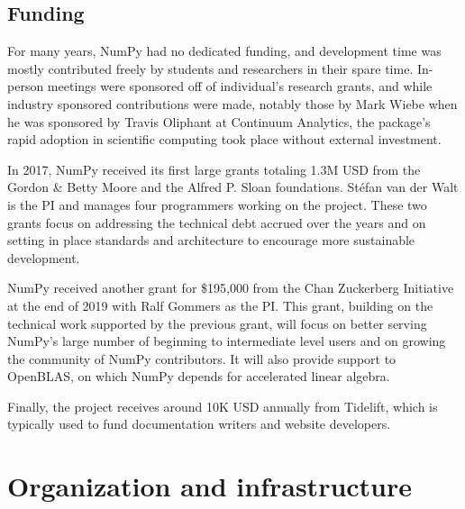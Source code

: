 \subsection{Funding}

For many years, NumPy had no dedicated funding, and development time
was mostly contributed freely by students and researchers in their
spare time.  In-person meetings were sponsored off of individual's
research grants, and while industry sponsored contributions were made,
notably those by Mark Wiebe when he was sponsored by Travis Oliphant
at Continuum Analytics, the package's rapid adoption in scientific
computing took place without external investment.

In 2017, NumPy received its first large grants totaling 1.3M USD from the
Gordon \& Betty Moore and the Alfred P. Sloan foundations.
Stéfan van der Walt is the PI and manages four programmers working on the project.
These two grants focus on addressing the technical debt accrued over the years and
on setting in place standards and architecture to encourage more sustainable development.

NumPy received another grant for \$195,000 from the Chan Zuckerberg
Initiative at the end of 2019 with Ralf Gommers as the PI.
This grant, building on the technical work supported by the previous
grant, will focus on better serving NumPy's large number of beginning
to intermediate level users and on growing the community of NumPy
contributors.
It will also provide support to OpenBLAS, on which NumPy depends for
accelerated linear algebra.

Finally, the project receives around 10K USD annually from Tidelift, which is
typically used to fund documentation writers and website developers.

\section{Organization and infrastructure}


